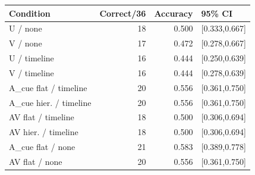 \begin{tabular}{lrrl}
\toprule Condition & Correct/36 & Accuracy & 95\% CI \\
\midrule
U / none & 18 & 0.500 & [0.333,0.667] \\
V / none & 17 & 0.472 & [0.278,0.667] \\
U / timeline & 16 & 0.444 & [0.250,0.639] \\
V / timeline & 16 & 0.444 & [0.278,0.639] \\
A\_cue flat / timeline & 20 & 0.556 & [0.361,0.750] \\
A\_cue hier. / timeline & 20 & 0.556 & [0.361,0.750] \\
AV flat / timeline & 18 & 0.500 & [0.306,0.694] \\
AV hier. / timeline & 18 & 0.500 & [0.306,0.694] \\
A\_cue flat / none & 21 & 0.583 & [0.389,0.778] \\
AV flat / none & 20 & 0.556 & [0.361,0.750] \\
\bottomrule
\end{tabular}
